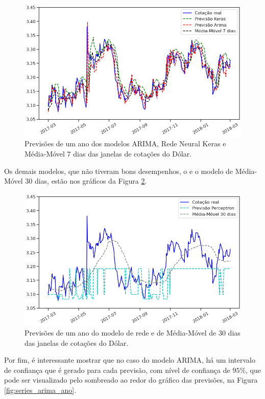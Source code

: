 \begin{figure}[htb]
\centering
\includegraphics[width=14cm]{figuras/series_previsoes_ano_1}
\caption{Previsões de um ano dos modelos ARIMA, Rede Neural Keras e Média-Móvel $7$ dias das janelas de cotações do Dólar.}
\label{fig:previsoes_ano_1}
\end{figure}

Os demais modelos, que não tiveram bons desempenhos, o  e o modelo de Média-Móvel $30$ dias, estão nos gráficos da Figura \ref{fig:previsoes_ano_2}.

\begin{figure}[htb]
\centering
\includegraphics[width=14cm]{figuras/series_previsoes_ano_2}
\caption{Previsões de um ano do modelo de rede  e de Média-Móvel de $30$ dias das janelas de cotações do Dólar.}
\label{fig:previsoes_ano_2}
\end{figure}

Por fim, é interessante mostrar que no caso do modelo ARIMA, há um intervalo de confiança que é gerado para cada previsão, com nível de confiança de $95\%$, que pode ser visualizado pelo sombreado ao redor do gráfico das previsões, na Figura \ref{fig:series_arima_ano}.

